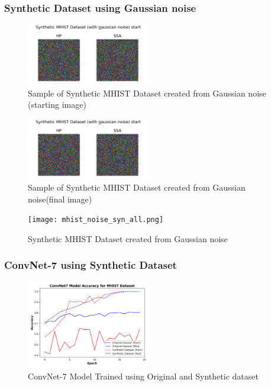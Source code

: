 \documentclass[conference, compsoc]{IEEEtran}
\begin{document}
\subsubsection{Synthetic Dataset using Gaussian noise}
\begin{figure}[H]
	\centering
	\includegraphics[width=0.48\textwidth]{mhist_noise_sample.png}
	\caption{Sample of Synthetic MHIST Dataset created from Gaussian noise (starting image)}
	\label{fig:mhist_noise_sample}
\end{figure}
\begin{figure}[H]
	\centering
	\includegraphics[width=0.48\textwidth]{mhist_noise_sample.png}
	\caption{Sample of Synthetic MHIST Dataset created from Gaussian noise(final image)}
	\label{fig:mhist_noise_final}
\end{figure}


\begin{figure}[H]
	\centering
	\texttt{[image: mhist\_noise\_syn\_all.png]}
	\caption{Synthetic MHIST Dataset created from Gaussian noise}
	\label{fig:mhist_noise_syn_all}
\end{figure}

\subsubsection{ConvNet-7 using Synthetic Dataset}
\begin{figure}[H]
	\centering
	\includegraphics[width=0.48\textwidth]{mhist_syn_acc.png}
	\caption{ConvNet-7 Model Trained using Original and Synthetic dataset}
	\label{fig:mhist_syn_acc}
\end{figure}
\end{document}
